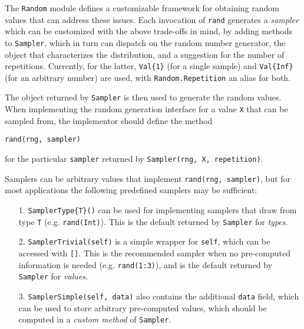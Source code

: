 The \texttt{Random} module defines a customizable framework for obtaining random values that can address these issues. Each invocation of \texttt{rand} generates a \emph{sampler} which can be customized with the above trade-offs in mind, by adding methods to \texttt{Sampler}, which in turn can dispatch on the random number generator, the object that characterizes the distribution, and a suggestion for the number of repetitions. Currently, for the latter, \texttt{Val\{1\}} (for a single sample) and \texttt{Val\{Inf\}} (for an arbitrary number) are used, with \texttt{Random.Repetition} an alias for both.



The object returned by \texttt{Sampler} is then used to generate the random values. When implementing the random generation interface for a value \texttt{X} that can be sampled from, the implementor should define the method




\begin{verbatim}
rand(rng, sampler)
\end{verbatim}



for the particular \texttt{sampler} returned by \texttt{Sampler(rng, X, repetition)}.



Samplers can be arbitrary values that implement \texttt{rand(rng, sampler)}, but for most applications the following predefined samplers may be sufficient:



\begin{itemize}
\item[1. ] \texttt{SamplerType\{T\}()} can be used for implementing samplers that draw from type \texttt{T} (e.g. \texttt{rand(Int)}). This is the default returned by \texttt{Sampler} for \emph{types}.


\item[2. ] \texttt{SamplerTrivial(self)} is a simple wrapper for \texttt{self}, which can be accessed with \texttt{[]}. This is the recommended sampler when no pre-computed information is needed (e.g. \texttt{rand(1:3)}), and is the default returned by \texttt{Sampler} for \emph{values}.


\item[3. ] \texttt{SamplerSimple(self, data)} also contains the additional \texttt{data} field, which can be used to store arbitrary pre-computed values, which should be computed in a \emph{custom method} of \texttt{Sampler}.

\end{itemize}


